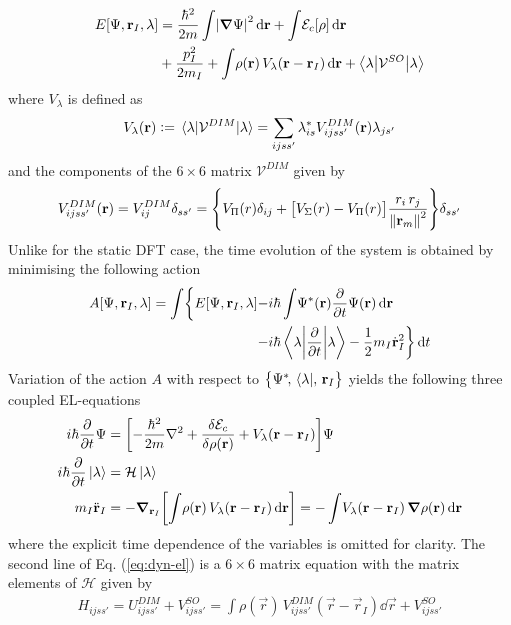 			\begin{align}
				E[\Psi, \vec{r}_I, \lambda] &= \frac{\hbar^2}{2m}\int\!\abs{\grad \Psi}^2\diff{r}
				+ \int\!{\cal E}_c[\rho]\diff{r} \nonumber \\
				&+ \frac{p^2_I}{2 m_I}
				+ \int\!\rho(\vec{r})\,V_\lambda(\vec{r}-\vec{r}_I)\diff{r}
				+ \ev**{\mathcal{V}^{SO}}{\lambda}
			\end{align}
			where $V_\lambda$ is defined as
			\begin{align}
				V_\lambda(\vec{r}) \vcentcolon= \ev{\mathcal{V}^{DIM}}{\lambda} = \sum_{ijss'}\lambda^*_{is}V^{DIM}_{ijss'}(\vec{r})\lambda_{js'} 
			\end{align}
			and the components of the $6\times6$ matrix ${\mathcal V}^{DIM}$ given by
			\begin{equation}
				V^{DIM}_{ijss'}(\bm{\mathrm{r}})=V^{DIM}_{ij}\delta_{ss'}=\qty{V_\Pi(r)\delta_{ij}+\qty\big[V_\Sigma(r)-V_\Pi(r)]\frac{r_i\,r_j}{\norm{\bm{\mathrm{r}}_m}^2}}\delta_{ss'}
			\end{equation}
			Unlike for the static DFT case, the time evolution of the system is obtained by minimising the following action
			\begin{align}
				A[\Psi,\vec{r}_I,\lambda] = \int\!\bigg\{E[\Psi,\vec{r}_I,\lambda] -&i\hbar\int \!\Psi^*(\vec{r}) \pdv{t}\Psi(\vec{r})\dd{\vec{r}} \nonumber \\
				-&i\hbar\ev**{\pdv{t}}{\lambda} - \frac{1}{2} m_I \dot{\vec{r}}^2_I\bigg\}\dd{t} \label{eq:action}
			\end{align}
			Variation of the action $A$ with respect to $\qty\big{\Psi^*\!,\,\bra\lambda\!,\,\bm{\mathrm{r}}_I}$ yields the following three coupled EL-equations
			\begin{align}
				i\hbar\pdv{t}\Psi &= \qty[-\frac{\hbar^2}{2m}\laplacian +\fdv{\mathcal{E}_c}{\rho(\mathbf{r})} + V_\lambda(\vec{r}-\vec{r}_I)]\Psi \nonumber \\
				i\hbar\pdv{t}\ket\lambda  &= \mathcal{H}\ket\lambda \nonumber \\
				m_I\ddot{\vec{r}}_I &= - \grad_{\vec{r}_I}\qty[\int\!\rho(\vec{r})\,V_\lambda(\vec{r}-\vec{r}_I)\dd{\vec{r}}] = -\int\!V_\lambda(\vec{r}-\vec{r}_I)\,\grad\rho(\vec{r})\dd{\vec{r}} \label{eq:dyn-el}
			\end{align}
			where the explicit time dependence of the variables is omitted for clarity. The second line of Eq. (\ref{eq:dyn-el}) is a $6\times 6$ matrix equation with the matrix elements of $\mathcal{H}$ given by
			\begin{align}
				H_{ijss'} = U^{DIM}_{ijss'}+V^{SO}_{ijss'} = \int\!\rho(\vec{r})\,V^{DIM}_{ijss'}(\vec{r}-\vec{r}_I)\dd{\vec{r}}+V^{SO}_{ijss'}
			\end{align}
